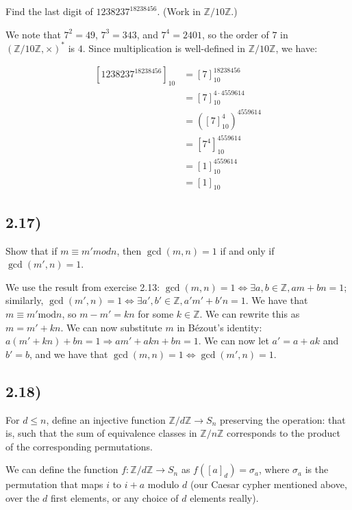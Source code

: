 \documentclass[12pt, letterpaper, twoside]{report}
\begin{document}
Find the last digit of $1238237^{18238456}$. (Work in $\mathbb{Z}/10\mathbb{Z}$.)

We note that $7^2 = 49$, $7^3 = 343$, and $7^4 = 2401$, so the order of $7$ in $(\mathbb{Z}/10\mathbb{Z}, \times)^*$ is $4$.  Since multiplication is well-defined in $\mathbb{Z}/10\mathbb{Z}$, we have:

$$
\begin{aligned}
[1238237^{18238456}]_{10}
&= [7]_{10}^{18238456} \\
&= [7]_{10}^{4 \cdot 4559614} \\
&= ([7]_{10}^4)^{4559614} \\
&= [7^4]_{10}^{4559614} \\
&= [1]_{10}^{4559614} \\
&= [1]_{10}
\end{aligned}
$$


\subsection*{2.17)}

Show that if $m \equiv m' mod n$, then $\gcd(m, n) = 1$ if and only if $\gcd(m', n) = 1$.

We use the result from exercise 2.13: $\gcd(m, n) = 1 \Leftrightarrow \exists a, b \in \mathbb{Z}, am + bn = 1$; similarly, $\gcd(m', n) = 1 \Leftrightarrow \exists a', b' \in \mathbb{Z}, a'm' + b'n = 1$.  We have that $m \equiv m' \text{mod} n$, so $m - m' = kn$ for some $k \in \mathbb{Z}$. We can rewrite this as $m = m' + kn$. We can now substitute $m$ in Bézout's identity: $a(m' + kn) + bn = 1 \Rightarrow am' + akn + bn = 1$. We can now let $a' = a + ak$ and $b' = b$, and we have that $\gcd(m, n) = 1 \Leftrightarrow \gcd(m', n) = 1$.


\subsection*{2.18)}

For $d \leq n$, define an injective function $\mathbb{Z}/d\mathbb{Z} \to S_n$ preserving the operation: that is, such that the sum of equivalence classes in $\mathbb{Z}/n\mathbb{Z}$ corresponds to the product of the corresponding permutations.

We can define the function $f: \mathbb{Z}/d\mathbb{Z} \to S_n$ as $f([a]_d) = \sigma_a$, where $\sigma_a$ is the permutation that maps $i$ to $i + a$ modulo $d$ (our Caesar cypher mentioned above, over the $d$ first elements, or any choice of $d$ elements really).
\end{document}
